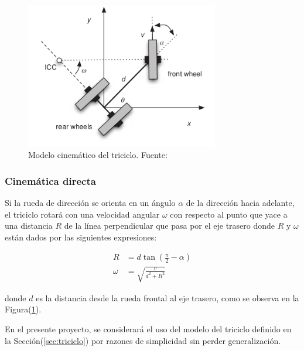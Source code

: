     \begin{figure}[!h] 
        \centering
        \includegraphics[width=0.75\textwidth]{img/triciclo}
        \caption[Modelo cinemático del triciclo]{Modelo cinemático del triciclo. Fuente: \cite{GregoryMcGillUniversity2010} }
        \label{fig:triciclo}
    \end{figure}    

        \subsubsection{Cinemática directa}
        Si la rueda de dirección se orienta en un ángulo $\alpha$ de la dirección hacia adelante, el triciclo rotará con una 
        velocidad angular $\omega$ con respecto al punto que yace a una distancia $R$ de la línea perpendicular que pasa 
        por el eje trasero donde $R$ y $\omega$ están dados por las siguientes expresiones:

        \begin{align}
            R       &= d \tan(\frac{\pi}{2} - \alpha) \\
            \omega  &= \sqrt{\frac{v}{d^2 + R^2}}
        \end{align}

        donde $d$ es la distancia desde la rueda frontal al eje trasero, como se observa en la Figura(\ref{fig:triciclo}).
    
        En el presente proyecto, se considerará el uso del modelo del triciclo definido en la Sección(\ref{sec:triciclo}) 
        por razones de simplicidad sin perder generalización.
